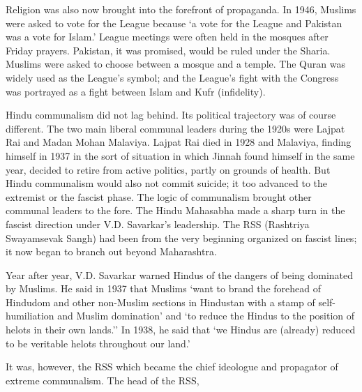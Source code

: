 \begin{multicols}{2}
Religion was also now brought into the forefront of propaganda. In 1946, Muslims were asked to vote for the League because `a vote for the League and Pakistan was a vote for Islam.' League meetings were often held in the mosques after Friday prayers. Pakistan, it was promised, would be ruled under the Sharia. Muslims were asked to choose between a mosque and a temple. The Quran was widely used as the League's symbol; and the League's fight with the Congress was portrayed as a fight between Islam and Kufr (infidelity). 

Hindu communalism did not lag behind. Its political trajectory was of course different. The two main liberal communal leaders during the 1920s were Lajpat Rai and Madan Mohan Malaviya. Lajpat Rai died in 1928 and Malaviya, finding himself in 1937 in the sort of situation in which Jinnah found himself in the same year, decided to retire from active politics, partly on grounds of health. But Hindu communalism would also not commit suicide; it too advanced to the extremist or the fascist phase. The logic of communalism brought other communal leaders to the fore. The Hindu Mahasabha made a sharp turn in the fascist direction under V.D. Savarkar's leadership. The RSS (Rashtriya Swayamsevak Sangh) had been from the very beginning organized on fascist lines; it now began to branch out beyond Maharashtra. 

Year after year, V.D. Savarkar warned Hindus of the dangers of being dominated by Muslims. He said in 1937 that Muslims `want to brand the forehead of Hindudom and other non-Muslim sections in Hindustan with a stamp of self- humiliation and Muslim domination' and `to reduce the Hindus to the position of helots in their own lands.'' In 1938, he said that `we Hindus are (already) reduced to be veritable helots throughout our land.' 

It was, however, the RSS which became the chief ideologue and propagator of extreme communalism. The head of the RSS, 


\end{multicols}
